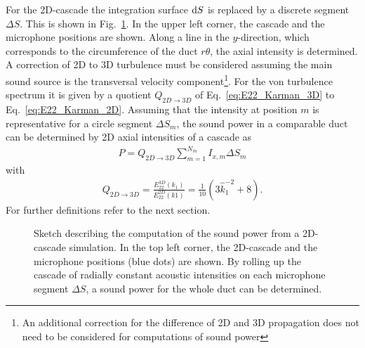 For the 2D-cascade the integration surface $\text{d} S$ is replaced by a discrete segment $\Delta S$. This is shown in Fig.~\ref{fig:powerSketch}. In the upper left corner, the cascade and the microphone positions are shown. Along a line in the $y$-direction, which corresponds to the circumference of the duct $r\theta$, the axial intensity is determined. A correction of 2D to 3D turbulence must be considered assuming the main sound source is the transversal velocity component\footnote{An additional correction for the difference of 2D and 3D propagation does not need to be considered for computations of sound power}. For the von \Karman turbulence spectrum it is given by a quotient $Q_{2D\rightarrow3D}$ of Eq.~\ref{eq:E22_Karman_3D} to Eq.~\ref{eq:E22_Karman_2D}. Assuming that the intensity at position $m$ is representative for a circle segment $\Delta S_m$, the sound power in a comparable duct can be determined by 2D axial intensities of a cascade as
\begin{align}\label{eq:P}
P = Q_{2D\rightarrow3D} \sum\limits_{m=1}^{N_m} I_{x,m} \Delta S_m
\end{align}
with
\begin{align}\label{eq:2D3DGeschwSpektrum}
Q_{2D\rightarrow3D} = \frac{E_{22}^{3D}(k_1)}{E_{22}^{2D}(k1)} = \frac{1}{10}\left(3\hat k_1^{-2}+8\right).
\end{align}
For further definitions refer to the next section.

% 

\begin{figure}
	\begin{minipage}{0.7\textwidth}
		\centering
		
	\end{minipage}\hfill
	\begin{minipage}{0.3\textwidth}
		\caption{Sketch describing the computation of the sound power from a 2D-cascade simulation. In the top left corner, the 2D-cascade and the microphone positions (blue dots) are shown. By rolling up the cascade of radially constant  acoustic intensities on each microphone segment $\Delta S$, a sound power for the whole duct can be determined.\label{fig:powerSketch}}
	\end{minipage}
\end{figure}


